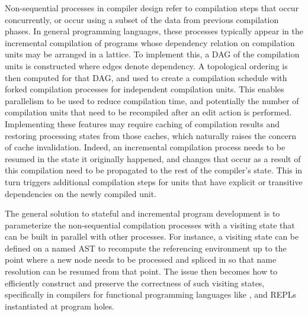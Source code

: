 
Non-sequential processes in compiler design refer to compilation steps that occur concurrently, or occur using a subset of the data from previous compilation phases.
In general programming languages, these processes typically appear in the incremental compilation of programs whose dependency relation on compilation units may be arranged in a lattice.
To implement this, a \ac{DAG} of the compilation units is constructed where edges denote dependency.
A topological ordering is then computed for that \ac{DAG}, and used to create a compilation schedule with forked compilation processes for independent compilation units.
This enables parallelism to be used to reduce compilation time, and potentially the number of compilation units that need to be recompiled after an edit action is performed.
Implementing these features may require caching of compilation results and restoring processing states from those caches, which naturally raises the concern of cache invalidation.
Indeed, an incremental compilation process needs to be resumed in the state it originally happened, and changes that occur as a result of this compilation need to be propagated to the rest of the compiler's state.
This in turn triggers additional compilation steps for units that have explicit or transitive dependencies on the newly compiled unit.

The general solution to stateful and incremental program development is to parameterize the non-sequential compilation processes with a visiting state that can be built in parallel with other processes.
For instance, a visiting state can be defined on a named \ac{AST} to recompute the referencing environment up to the point where a new node needs to be processed and spliced in so that name resolution can be resumed from that point.
The issue then becomes how to efficiently construct and preserve the correctness of such visiting states, specifically in compilers for functional programming languages like \Beluga, and \acp{REPL} instantiated at program holes.

